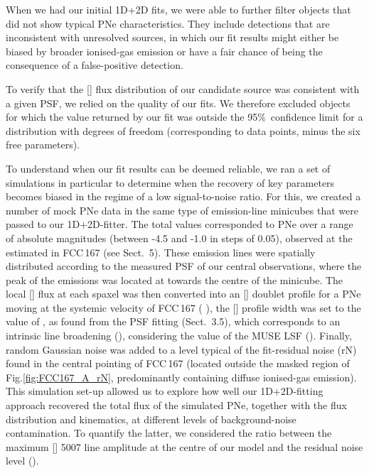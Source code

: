 \documentclass{aa}
\begin{document}
When we had our initial 1D+2D fits, we were able to further filter objects that did not show typical PNe characteristics. They include detections that are inconsistent with unresolved sources, in which our fit results might either be biased by broader ionised-gas emission or have a fair chance of being the consequence of a false-positive detection. 

To verify that the [] flux distribution of our candidate source was consistent with a given PSF, we relied on the quality of our fits. We therefore excluded objects for which the  value returned by our fit was outside the 95\%\  confidence limit for a  distribution with  degrees of freedom (corresponding to  data points, minus the six free parameters).

To understand when our fit results can be deemed reliable, we ran a set of simulations in particular to determine when the recovery of key parameters becomes biased in the regime of a low signal-to-noise ratio.
For this, we created a number of mock PNe data in the same type of emission-line  minicubes that were passed to our 1D+2D-fitter. The total  values corresponded to PNe over a range of absolute  magnitudes (between -4.5 and -1.0 in steps of 0.05), observed at the estimated  in FCC\,167 (see Sect.~5). These emission lines were spatially distributed according to the measured PSF of our central observations, where the peak of the emissions was located at towards the centre of the minicube. The local [] flux at each spaxel was then converted into an [] doublet profile for a PNe moving at the systemic velocity of FCC\,167 ( \citet{iodice_fornax3d_2019}), the [] profile width was set to the value of , as found from the PSF fitting (Sect.~3.5), which corresponds to an intrinsic line broadening (), considering the value of the MUSE LSF (). Finally, random Gaussian noise was added to a level typical of the fit-residual noise (rN) found in the central pointing of FCC\,167 (located outside the masked region of Fig.\ref{fig:FCC167_A_rN}, predominantly containing diffuse ionised-gas emission). This simulation set-up allowed us to explore how well our 1D+2D-fitting approach recovered the total flux of the simulated PNe, together with the flux distribution and kinematics, at different levels of background-noise contamination. To quantify the latter, we considered the ratio between the maximum [] 5007 line amplitude at the centre of our model and the residual noise level ().
\end{document}
